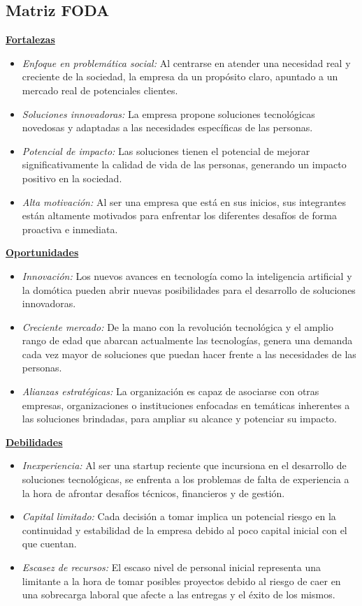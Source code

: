 \documentclass[a4paper,12pt]{article}
\begin{document}
    \subsection{Matriz FODA}
    \textbf{\underline{Fortalezas}}
    \begin{itemize}
        \item[] \textit{Enfoque en problemática social:} Al centrarse en atender una necesidad real y creciente de la sociedad, la empresa da un propósito claro, apuntado a un mercado real de potenciales clientes.
        \item[] \textit{Soluciones innovadoras:} La empresa propone soluciones tecnológicas novedosas y adaptadas a las necesidades específicas de las personas.
        \item[] \textit{Potencial de impacto:} Las soluciones tienen el potencial de mejorar significativamente la calidad de vida de las personas, generando un impacto positivo en la sociedad.
        \item[] \textit{Alta motivación:} Al ser una empresa que está en sus inicios, sus integrantes están altamente motivados para enfrentar los diferentes desafíos de forma proactiva e inmediata.
    \end{itemize}
    \textbf{\underline{Oportunidades}}
    \begin{itemize}
        \item[] \textit{Innovación:} Los nuevos avances en tecnología como la inteligencia artificial y la domótica pueden abrir nuevas posibilidades para el desarrollo de soluciones innovadoras.
        \item[] \textit{Creciente mercado:} De la mano con la revolución tecnológica y el amplio rango de edad que abarcan actualmente las tecnologías, genera una demanda cada vez mayor de soluciones que puedan hacer frente a las necesidades de las personas.
        \item[] \textit{Alianzas estratégicas:} La organización es capaz de asociarse con otras empresas, organizaciones o instituciones enfocadas en temáticas inherentes a las soluciones brindadas, para ampliar su alcance y potenciar su impacto.
    \end{itemize}
    \textbf{\underline{Debilidades}}
    \begin{itemize}
        \item[] \textit{Inexperiencia:} Al ser una startup reciente que incursiona en el desarrollo de soluciones tecnológicas, se enfrenta a los problemas de falta de experiencia a la hora de afrontar desafíos técnicos, financieros y de gestión.
        \item[] \textit{Capital limitado:} Cada decisión a tomar implica un potencial riesgo en la continuidad y estabilidad de la empresa debido al poco capital inicial con el que cuentan.
        \item[] \textit{Escasez de recursos:} El escaso nivel de personal inicial representa una limitante a la hora de tomar posibles proyectos debido al riesgo de caer en una sobrecarga laboral que afecte a las entregas y el éxito de los mismos.
    \end{itemize}
\end{document}
